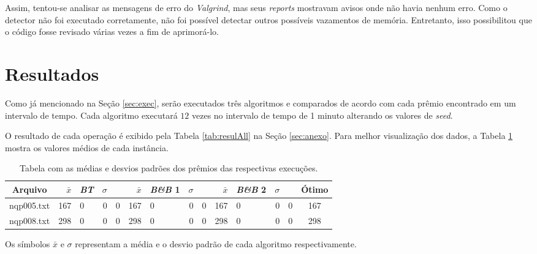 \documentclass[12pt]{article}
\begin{document}
		Assim, tentou-se analisar as mensagens de erro do \textit{Valgrind}, mas seus \textit{reports} mostravam avisos onde não havia nenhum erro. Como o detector não foi executado corretamente, não foi possível detectar outros possíveis vazamentos de memória. Entretanto, isso possibilitou que o código fosse revisado várias vezes a fim de aprimorá-lo.

\section{Resultados}
	Como já mencionado na Seção \ref{sec:exec}, serão executados três algoritmos e comparados de acordo com cada prêmio encontrado em um intervalo de tempo. Cada algoritmo executará $ 12 $ vezes no intervalo de tempo de 1 minuto alterando os valores de \textit{seed}.

	O resultado de cada operação é exibido pela Tabela \ref{tab:resulAll} na Seção \ref{sec:anexo}. Para melhor visualização dos  dados, a Tabela \ref{tab:resul} mostra os valores médios de cada instância.

		\begin{table}[H]
			\centering
			\caption{Tabela com as médias e desvios padrões dos prêmios das respectivas execuções.} \label{tab:resul}
			{ \scriptsize

				\begin{tabular}{c||r@{.}lr@{.}l|r@{.}lr@{.}l|r@{.}lr@{.}l||c}
					\hline
					\textbf{Arquivo}    & $ \bar{x} $ & \textit{\textbf{BT}}   & $\sigma$ &                & $ \bar{x} $ & \textbf{\textit{B\&B} 1}      & $\sigma$  &                 & $ \bar{x} $ & \textbf{\textit{B\&B} 2}  & $\sigma$  &              & \textbf{Ótimo} \\ \hline
					nqp005.txt & 167         & 0             &  0       & 0              & 167         & 0                    &  0        & 0               & 167  & 0                       &  0        & 0            & 167          \\
					nqp008.txt & 298         & 0             &  0       & 0              & 298         & 0                    &  0        & 0               & 298  & 0                       &  0        & 0            & 298          \\
				\end{tabular}
			}
		\end{table}

		Os símbolos $ \bar{x} $ e $ \sigma $ representam a média e o desvio padrão de cada algoritmo respectivamente.
\end{document}
